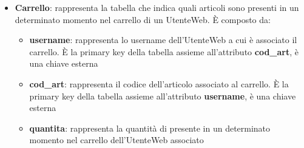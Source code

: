 \begin{itemize}
\begin{itemize}
		\item \textbf{id\_messaggio}: rappresenta l'id di un messaggio all'interno di una conversazione. È una primary key assieme all'attributo \textbf{id\_conv}
		\item \textbf{mittente}: rappresenta chi ha inviato il messaggio. È rappresentato da un enum e può essere solo utente oppure chatbot
		\item \textbf{contenuto}: rappresenta il testo del messaggio
	\end{itemize}
	\item \textbf{Carrello}: rappresenta la tabella che indica quali articoli sono presenti in un determinato momento nel carrello di un UtenteWeb. È composto da:
	\begin{itemize}
		\item \textbf{username}: rappresenta lo username dell'UtenteWeb a cui è associato il carrello. È la primary key della tabella assieme all'attributo \textbf{cod\_art}, è una chiave esterna
		\item \textbf{cod\_art}: rappresenta il codice dell'articolo associato al carrello. È la primary key della tabella assieme all'attributo \textbf{username}, è una chiave esterna
		\item \textbf{quantita}: rappresenta la quantità di  presente in un determinato momento nel carrello dell'UtenteWeb associato
	\end{itemize}
	
\end{itemize}